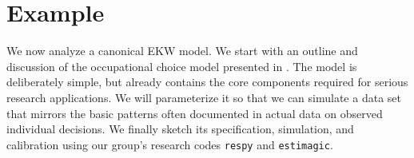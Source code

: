 \section{Example}\label{Example}
We now analyze a canonical EKW model. We start with an outline and discussion of the occupational choice model presented in \citet{Keane.1994}. The model is deliberately simple, but already contains the core components required for serious research applications. We will parameterize it so that we can simulate a data set that mirrors the basic patterns often documented in actual data on observed individual decisions. We finally sketch its specification, simulation, and calibration using our group's research codes \verb+respy+ and \verb+estimagic+.
